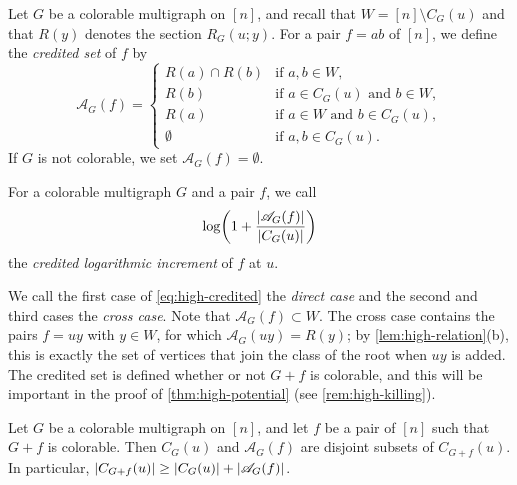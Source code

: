 \begin{definition}\label{def:high-credited}
Let $G$ be a colorable multigraph on $[n]$, and recall that $W = [n] \setminus C_G(u)$ and that $R(y)$ denotes the section $R_G(u; y)$. For a pair $f = ab$ of $[n]$, we define the \emph{credited set} of $f$ by
\begin{equation}\label{eq:high-credited}
\mathscr{A}_G(f) =
\begin{cases}
R(a) \cap R(b) & \text{if } a, b \in W, \\
R(b) & \text{if } a \in C_G(u) \text{ and } b \in W, \\
R(a) & \text{if } a \in W \text{ and } b \in C_G(u), \\
\emptyset & \text{if } a, b \in C_G(u).
\end{cases}
\end{equation}
If $G$ is not colorable, we set $\mathscr{A}_G(f) = \emptyset$.
\end{definition}

For a colorable multigraph $G$ and a pair $f$, we call
\[
\log \biggl( 1 + \frac{\left|\mathscr{A}_G(f)\right|}{\left|C_G(u)\right|} \biggr)
\]
the \emph{credited logarithmic increment} of $f$ at $u$.

We call the first case of \eqref{eq:high-credited} the \emph{direct case} and the second and third cases the \emph{cross case}. Note that $\mathscr{A}_G(f) \subset W$. The cross case contains the pairs $f = uy$ with $y \in W$, for which $\mathscr{A}_G(uy) = R(y)$; by \cref{lem:high-relation}(b), this is exactly the set of vertices that join the class of the root when $uy$ is added. The credited set is defined whether or not $G + f$ is colorable, and this will be important in the proof of \cref{thm:high-potential} (see \cref{rem:high-killing}).

\begin{lemma}\label{lem:high-absorb}
Let $G$ be a colorable multigraph on $[n]$, and let $f$ be a pair of $[n]$ such that $G + f$ is colorable. Then $C_G(u)$ and $\mathscr{A}_G(f)$ are disjoint subsets of $C_{G + f}(u)$. In particular, $\left|C_{G + f}(u)\right| \ge \left|C_G(u)\right| + \left|\mathscr{A}_G(f)\right|$.
\end{lemma}

